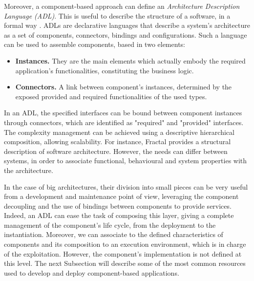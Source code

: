 Moreover, a component-based approach can define an \textit{Architecture Description Language (ADL)}.
This is useful to describe the structure of a software, in a formal way \cite{taylor2009architectural} \cite{len2003software} \cite{medvidovic2000classification}.
ADLs are declarative languages that describe a system's architecture as a set of components, connectors, bindings and configurations.
Such a language can be used to assemble components, based in two elements:

\begin{itemize}
	\item \textbf{Instances.} They are the main elements which actually embody the required application's functionalities, constituting the business logic.
	\item \textbf{Connectors.} A link between component's instances, determined by the exposed provided and required functionalities of the used types.
\end{itemize}

In an ADL, the specified interfaces can be bound between component instances through connectors, which are identified as "required" and "provided" interfaces.
The complexity management can be achieved using a descriptive hierarchical composition, allowing scalability.
For instance, Fractal \cite{bruneton2006fractal} provides a structural description of software architecture.
However, the needs can differ between systems, in order to associate functional, behavioural and system properties with the architecture.

In the case of big architectures, their division into small pieces can be very useful from a development and maintenance point of view, leveraging the component decoupling and the use of bindings between components to provide services.
Indeed, an ADL can ease the task of composing this layer, giving a complete management of the component's life cycle, from the deployment to the instantiation.
Moreover, we can associate to the defined characteristics of components and its composition to an execution environment, which is in charge of the exploitation.
However, the component's implementation is not defined at this level.
The next Subsection will describe some of the most common resources used to develop and deploy component-based applications.

